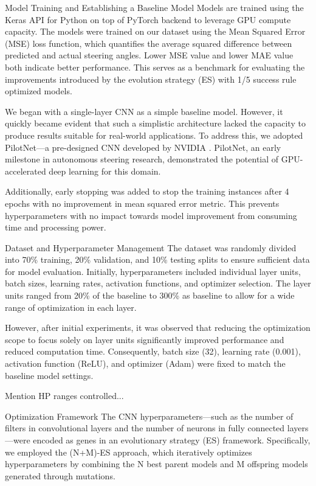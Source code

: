\documentclass[conference]{IEEEtran}
\begin{document}
Model Training and Establishing a Baseline Model
Models are trained using the Keras API for Python on top of PyTorch backend to leverage GPU compute capacity. The models were trained on our dataset using the Mean Squared Error (MSE) loss function, which quantifies the average squared difference between predicted and actual steering angles. Lower MSE value and lower MAE value both indicate better performance. This serves as a benchmark for evaluating the improvements introduced by the evolution strategy (ES) with 1/5 success rule optimized models.

We began with a single-layer CNN as a simple baseline model. However, it quickly became evident that such a simplistic architecture lacked the capacity to produce results suitable for real-world applications. To address this, we adopted PilotNet—a pre-designed CNN developed by NVIDIA \cite{PilotNET}. PilotNet, an early milestone in autonomous steering research, demonstrated the potential of GPU-accelerated deep learning for this domain.

Additionally, early stopping was added to stop the training instances after 4 epochs with no improvement in mean squared error metric. This prevents hyperparameters with no impact towards model improvement from consuming time and processing power.

Dataset and Hyperparameter Management
The dataset was randomly divided into 70\% training, 20\% validation, and 10\% testing splits to ensure sufficient data for model evaluation. Initially, hyperparameters included individual layer units, batch sizes, learning rates, activation functions, and optimizer selection. The layer units ranged from 20\% of the baseline to 300\% as baseline to allow for a wide range of optimization in each layer.

However, after initial experiments, it was observed that reducing the optimization scope to focus solely on layer units significantly improved performance and reduced computation time. Consequently, batch size (32), learning rate (0.001), activation function (ReLU), and optimizer (Adam) were fixed to match the baseline model settings.

Mention HP ranges controlled...

Optimization Framework
The CNN hyperparameters—such as the number of filters in convolutional layers and the number of neurons in fully connected layers—were encoded as genes in an evolutionary strategy (ES) framework. Specifically, we employed the (N+M)-ES approach, which iteratively optimizes hyperparameters by combining the N best parent models and M offspring models generated through mutations.
\end{document}
